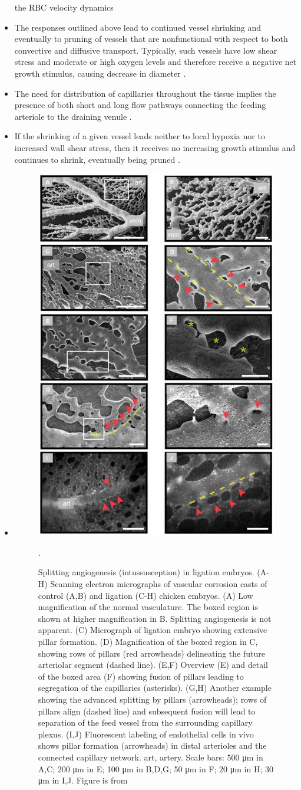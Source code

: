 \begin{itemize}
	the RBC velocity dynamics \cite{Carr2005}
	\item The responses outlined above lead to continued vessel shrinking and eventually to pruning of vessels that are nonfunctional with respect to both convective and diffusive transport. Typically, such vessels have low shear stress and moderate or high oxygen levels and therefore receive a negative net growth stimulus, causing decrease in diameter \cite{Pries2014}.
	\item The need for distribution of capillaries throughout the tissue implies the presence of both short and long flow pathways connecting the feeding arteriole to the draining venule \cite{Pries2014}.
	\item If the shrinking of a given vessel leads neither to local hypoxia nor to increased wall shear stress, then it receives no increasing growth stimulus and continues to shrink, eventually being pruned \cite{Pries2014}.
	\item 
	\begin{figure}
		\centering
		\includegraphics[width=0.5\linewidth]{images/pillarFormationInEmbryoLigation}
		\caption{Splitting angiogenesis (intussusception) in ligation embryos. (A-H) Scanning electron micrographs of vascular corrosion casts of control (A,B) and ligation (C-H) chicken embryos. (A) Low magnification of the normal vasculature. The boxed region is shown at higher magnification in B. Splitting angiogenesis is not apparent. (C) Micrograph of ligation embryo showing extensive pillar formation. (D) Magnification of the boxed region in C, showing rows of pillars (red arrowheads) delineating the future arteriolar segment (dashed line). (E,F) Overview (E) and detail of the boxed area (F) showing fusion of pillars leading to segregation of the capillaries (asterisks). (G,H) Another example showing the advanced splitting by pillars (arrowheads); rows of pillars align (dashed line) and subsequent fusion will lead to separation of the feed vessel from the surrounding capillary plexus. (I,J) Fluorescent labeling of endothelial cells in vivo shows pillar formation (arrowheads) in distal arterioles and the connected capillary network. art, artery. Scale bars: 500 μm in A,C; 200 μm in E; 100 μm in B,D,G; 50 μm in F; 20 μm in H; 30 μm in I,J. Figure is from \cite{Buschmann2010}}.

\end{figure}
\end{itemize}
